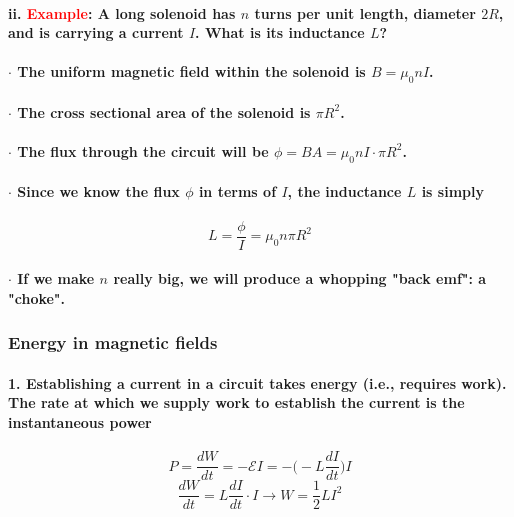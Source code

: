 \documentclass{article}
\begin{document}
\paragraph{\indent\indent ii. \textcolor{red}{Example}: A long solenoid has $n$ turns per unit length, diameter $2R$, and is carrying a current $I$. What is its inductance $L$?}
\paragraph{\indent\indent $\cdot$ The uniform magnetic field within the solenoid is $B=\mu_0nI$.}
\paragraph{\indent\indent $\cdot$ The cross sectional area of the solenoid is $\pi R^2$.}
\paragraph{\indent\indent $\cdot$ The flux through the circuit will be $\phi=BA=\mu_0nI\cdot\pi R^2$.}
\paragraph{\indent\indent $\cdot$ Since we know the flux $\phi$ in terms of $I$, the inductance $L$ is simply}
\begin{equation*}
    L=\frac{\phi}{I}=\mu_0n\pi R^2
\end{equation*}
\paragraph{\indent\indent $\cdot$ If we make $n$ really big, we will produce a whopping "back emf": a "choke".}
\subsubsection{Energy in magnetic fields}
\paragraph{1. Establishing a current in a circuit takes energy (i.e., requires work). The rate at which we supply work to establish the current is the instantaneous power}
\begin{equation*}
    P=\frac{dW}{dt}=-\mathcal{E}I=-\bigg(-L\frac{dI}{dt}\bigg)I
\end{equation*}
\begin{equation*}
    \frac{dW}{dt}=L\frac{dI}{dt}\cdot I\rightarrow W=\frac{1}{2}LI^2
\end{equation*}
\end{document}
